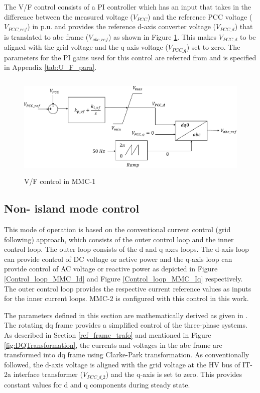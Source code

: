 The V/F control consists of a \gls{PI} controller which has an input that takes in the difference between the measured voltage ($V_{PCC}$) and the reference \gls{PCC} voltage ($V_{PCC\_ref}$) in p.u. and provides the reference d-axis converter voltage ($V_{PCC\_d}$) that is translated to abc frame ($V_{abc\_ref}$) as shown in Figure \ref{fig:U_F_control}. This makes $V_{PCC\_d}$ to be aligned with the grid voltage and the q-axis voltage ($V_{PCC\_q}$) set to zero. The parameters for the \gls{PI} gains used for this control are referred from \cite{vrana2013cigre} and is specified in Appendix \ref{tab:U_F_para}. 

\begin{figure}[H]
\centering
    \includegraphics[height = 5cm,width = 12.5cm]{Diagrams/Chapter_4/U_F_control.pdf}
    \caption{V/F control in MMC-1 \cite{vrana2013cigre}}
    \label{fig:U_F_control}
\end{figure}


\subsection{Non- island mode control}
This mode of operation is based on the conventional current control (grid following) approach, which consists of the outer control loop and the inner control loop. The outer loop consists of the d and q axes loops. The d-axis loop can provide control of \gls{DC} voltage or active power and the q-axis loop can provide control of \gls{AC} voltage or reactive power as depicted in Figure \ref{Control_loop_MMC_Id} and Figure \ref{Control_loop_MMC_Iq} respectively. The outer control loop provides the respective current reference values as inputs for the inner current loops. \gls{MMC}-2 is configured with this control in this work. 

The parameters defined in this section are mathematically derived as given in \cite{saad2015modelisation}. The rotating dq frame provides a simplified control of the three-phase systems. As described in Section \ref{ref_frame_trafo} and mentioned in Figure \ref{fig:DQTransformation}, the currents and voltages in the abc frame are transformed into \gls{dq} frame using Clarke-Park transformation.
As conventionally followed, the d-axis voltage is aligned with the grid voltage at the \gls{HV} bus of IT-2a interface transformer ($V_{PCC\_d\_2}$) and the q-axis is set to zero. This provides constant values for d and q components during steady state.

